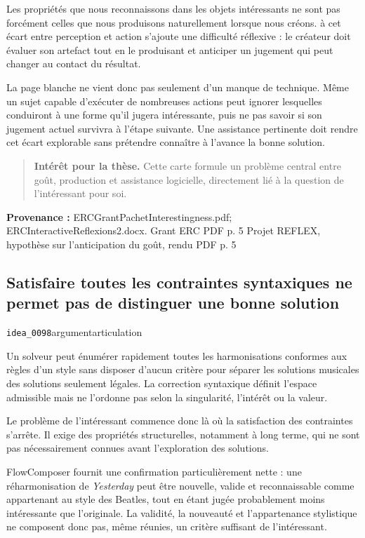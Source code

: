 \documentclass[10pt,a4paper]{article}
\begin{document}
Les propriétés que nous reconnaissons dans les objets intéressants ne sont pas forcément celles que nous produisons naturellement lorsque nous créons. à cet écart entre perception et action s'ajoute une difficulté réflexive : le créateur doit évaluer son artefact tout en le produisant et anticiper un jugement qui peut changer au contact du résultat.

La page blanche ne vient donc pas seulement d'un manque de technique. Même un sujet capable d'exécuter de nombreuses actions peut ignorer lesquelles conduiront à une forme qu'il jugera intéressante, puis ne pas savoir si son jugement actuel survivra à l'étape suivante. Une assistance pertinente doit rendre cet écart explorable sans prétendre connaître à l'avance la bonne solution.

\begin{quote}
\textbf{Intérêt pour la thèse.} Cette carte formule un problème central entre goût, production et assistance logicielle, directement lié à la question de l'intéressant pour soi.
\end{quote}
{\footnotesize\color{metadata}\textbf{Provenance :} ERCGrantPachetInterestingness.pdf; ERCInteractiveReflexions2.docx. Grant ERC PDF p. 5 Projet REFLEX, hypothèse sur l'anticipation du goût, rendu PDF p. 5\par}

\subsection{Satisfaire toutes les contraintes syntaxiques ne permet pas de distinguer une bonne solution}
{\small\color{metadata} \texttt{idea\_0098}\quad\textbullet\quad argument\quad\textbullet\quad articulation\par}

Un solveur peut énumérer rapidement toutes les harmonisations conformes aux règles d'un style sans disposer d'aucun critère pour séparer les solutions musicales des solutions seulement légales. La correction syntaxique définit l'espace admissible mais ne l'ordonne pas selon la singularité, l'intérêt ou la valeur.

Le problème de l'intéressant commence donc là où la satisfaction des contraintes s'arrête. Il exige des propriétés structurelles, notamment à long terme, qui ne sont pas nécessairement connues avant l'exploration des solutions.

FlowComposer fournit une confirmation particulièrement nette : une réharmonisation de \emph{Yesterday} peut être nouvelle, valide et reconnaissable comme appartenant au style des Beatles, tout en étant jugée probablement moins intéressante que l'originale. La validité, la nouveauté et l'appartenance stylistique ne composent donc pas, même réunies, un critère suffisant de l'intéressant.
\end{document}
